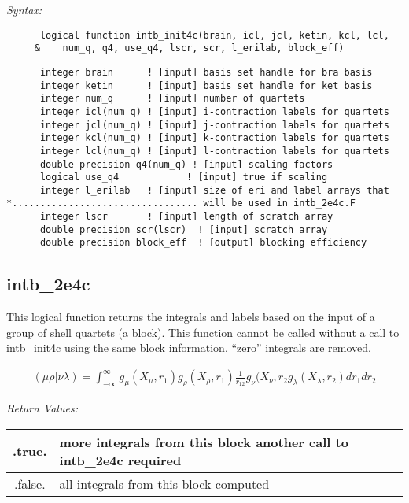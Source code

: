 {\it Syntax:} 
\begin{verbatim} 
      logical function intb_init4c(brain, icl, jcl, ketin, kcl, lcl, 
     &    num_q, q4, use_q4, lscr, scr, l_erilab, block_eff) 
\end{verbatim} 
\begin{verbatim} 
      integer brain      ! [input] basis set handle for bra basis 
      integer ketin      ! [input] basis set handle for ket basis 
      integer num_q      ! [input] number of quartets 
      integer icl(num_q) ! [input] i-contraction labels for quartets 
      integer jcl(num_q) ! [input] j-contraction labels for quartets 
      integer kcl(num_q) ! [input] k-contraction labels for quartets 
      integer lcl(num_q) ! [input] l-contraction labels for quartets 
      double precision q4(num_q) ! [input] scaling factors 
      logical use_q4            ! [input] true if scaling 
      integer l_erilab   ! [input] size of eri and label arrays that  
*................................. will be used in intb_2e4c.F 
      integer lscr       ! [input] length of scratch array 
      double precision scr(lscr)  ! [input] scratch array 
      double precision block_eff  ! [output] blocking efficiency  
\end{verbatim} 
 
\subsection{intb\_2e4c} 
This logical function returns the integrals and labels based on the 
input of a group of shell quartets (a block).  This function cannot be 
called without a call to intb\_init4c using the same block information. 
``zero'' integrals are removed. 
 
\begin{eqnarray*} 
({\mu}{\rho}|{\nu}{\lambda}) = \int_{-\infty}^{\infty} g_{\mu}(X_{\mu},r_{1})g_{\rho}(X_{\rho},r_{1})\frac{1}{r_{12}}g_{\nu}
(X_{\nu},r_{2}g_{\lambda}(X_{\lambda},r_{2})dr_{1}dr_{2} 
\end{eqnarray*} 
 
{\it Return Values:} 
\begin{tabular}{|c|p{60mm}|} \hline 
 .true.  & more integrals from this block another call to intb\_2e4c required \\ \hline 
 .false. & all integrals from this block computed\\ \hline 
\end{tabular} 
 
